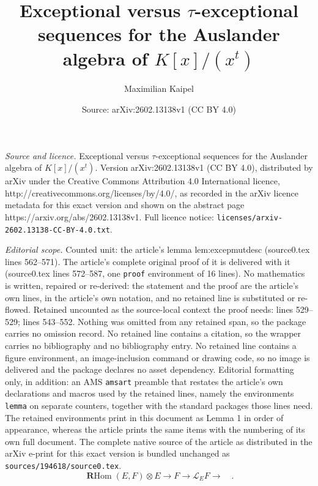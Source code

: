 \documentclass[10pt,a4paper]{amsart}
\title{Exceptional versus $\tau$-exceptional sequences for the Auslander algebra of $K[x]/(x^t)$}
\author{Maximilian Kaipel}
\date{Source: arXiv:2602.13138v1 (CC BY 4.0)}
\DeclareMathOperator{\RHom}{\textbf{R}Hom}
\begin{document}
\maketitle

\noindent\emph{Source and licence.} Exceptional versus $\tau$-exceptional sequences for the Auslander algebra of $K[x]/(x^t)$. Version arXiv:2602.13138v1 (CC BY 4.0), distributed by arXiv under the Creative Commons Attribution 4.0 International licence, http://creativecommons.org/licenses/by/4.0/, as recorded in the arXiv licence metadata for this exact version and shown on the abstract page https://arxiv.org/abs/2602.13138v1. Full licence notice: \texttt{licenses/arxiv-2602.13138-CC-BY-4.0.txt}.\par\smallskip

\noindent\textit{Editorial scope.} Counted unit: the article's lemma lem:excepmutdesc (source0.tex lines 562--571). The article's complete original proof of it is delivered with it (source0.tex lines 572--587, one \texttt{proof} environment of 16 lines). No mathematics is written, repaired or re-derived: the statement and the proof are the article's own lines, in the article's own notation, and no retained line is substituted or re-flowed.  Retained uncounted as the source-local context the proof needs: lines 529--529; lines 543--552.  Nothing was omitted from any retained span, so the package carries no omission record.  No retained line contains a citation, so the wrapper carries no bibliography and no bibliography entry.  No retained line contains a figure environment, an image-inclusion command or drawing code, so no image is delivered and the package declares no asset dependency.  Editorial formatting only, in addition: an AMS \texttt{amsart} preamble that restates the article's own declarations and macros used by the retained lines, namely the environments \texttt{lemma} on separate counters, together with the standard packages those lines need.  The retained environments print in this document as Lemma 1 in order of appearance, whereas the article prints the same items with the numbering of its own full document.  The complete native source of the article as distributed in the arXiv e-print for this exact version is bundled unchanged as \texttt{sources/194618/source0.tex}.
\begin{equation}\label{eq:leftmutexcep} \RHom(E,F) \otimes E \to F \to \mathcal{L}_E F \to  \quad .\end{equation}
\end{document}
